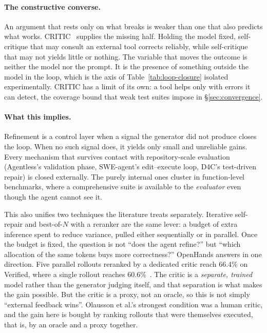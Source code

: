 \documentclass[
  english,        %
  font=times,     %
  twocolumn,      %
]{tumarticle}
\begin{document}
\paragraph{The constructive converse.}
An argument that rests only on what breaks is weaker than one that also predicts
what works. CRITIC~\cite{gou2024critic} supplies the missing half. Holding the
model fixed, self-critique that may consult an external tool corrects reliably,
while self-critique that may not yields little or nothing. The variable that moves
the outcome is neither the model nor the prompt. It is the presence of something
outside the model in the loop, which is the axis of Table~\ref{tab:loop-closure}
isolated experimentally. CRITIC has a limit of its own: a tool helps only with
errors it can detect, the coverage bound that weak test suites impose in
\S\ref{sec:convergence}.

\paragraph{What this implies.}
Refinement is a control layer when a signal the generator did not produce closes
the loop. When no such signal does, it yields only small and unreliable gains.
Every mechanism that survives contact with repository-scale evaluation
(Agentless's validation phase, SWE-agent's edit--execute loop, D4C's test-driven
repair) is closed externally. The purely internal ones cluster in function-level
benchmarks, where a comprehensive suite is available to the \emph{evaluator} even
though the agent cannot see it.

This also unifies two techniques the literature treats separately. Iterative
self-repair and best-of-$N$ with a reranker are the same lever: a budget of extra
inference spent to reduce variance, pulled either sequentially or in parallel.
Once the budget is fixed, the question is not ``does the agent refine?'' but
``which allocation of the same tokens buys more correctness?'' OpenHands answers
in one direction. Five parallel rollouts reranked by a dedicated critic reach
66.4\% on Verified, where a single rollout reaches
60.6\%~\cite{openhands2025verified}. The critic is a \emph{separate, trained}
model rather than the generator judging itself, and that separation is what makes
the gain possible. But the critic is a proxy, not an oracle, so this is not simply
``external feedback wins''. Olausson et al.'s strongest condition was a human
critic, and the gain here is bought by ranking rollouts that were themselves
executed, that is, by an oracle and a proxy together.
\end{document}

